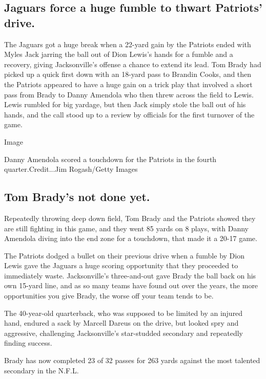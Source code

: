 \hypertarget{jaguars-force-a-huge-fumble-to-thwart-patriots-drive}{%
\subsection{Jaguars force a huge fumble to thwart Patriots'
drive.}\label{jaguars-force-a-huge-fumble-to-thwart-patriots-drive}}

The Jaguars got a huge break when a 22-yard gain by the Patriots ended
with Myles Jack jarring the ball out of Dion Lewis's hands for a fumble
and a recovery, giving Jacksonville's offense a chance to extend its
lead. Tom Brady had picked up a quick first down with an 18-yard pass to
Brandin Cooks, and then the Patriots appeared to have a huge gain on a
trick play that involved a short pass from Brady to Danny Amendola who
then threw across the field to Lewis. Lewis rumbled for big yardage, but
then Jack simply stole the ball out of his hands, and the call stood up
to a review by officials for the first turnover of the game.

Image

Danny Amendola scored a touchdown for the Patriots in the fourth
quarter.Credit...Jim Rogash/Getty Images

\hypertarget{tom-bradys-not-done-yet}{%
\subsection{Tom Brady's not done yet.}\label{tom-bradys-not-done-yet}}

Repeatedly throwing deep down field, Tom Brady and the Patriots showed
they are still fighting in this game, and they went 85 yards on 8 plays,
with Danny Amendola diving into the end zone for a touchdown, that made
it a 20-17 game.

The Patriots dodged a bullet on their previous drive when a fumble by
Dion Lewis gave the Jaguars a huge scoring opportunity that they
proceeded to immediately waste. Jacksonville's three-and-out gave Brady
the ball back on his own 15-yard line, and as so many teams have found
out over the years, the more opportunities you give Brady, the worse off
your team tends to be.

The 40-year-old quarterback, who was supposed to be limited by an
injured hand, endured a sack by Marcell Dareus on the drive, but looked
spry and aggressive, challenging Jacksonville's star-studded secondary
and repeatedly finding success.

Brady has now completed 23 of 32 passes for 263 yards against the most
talented secondary in the N.F.L.

